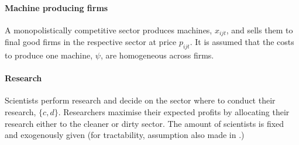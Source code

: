 \paragraph{Machine producing firms}
A monopolistically competitive sector produces machines, $x_{ijt}$, and sells them to final good firms in the respective sector at price $p_{ijt}$. It is assumed that the costs to produce one machine, $\psi$, are homogeneous across firms.
 \paragraph{Research}
 Scientists perform research and decide on the sector where to conduct their research, $\{c,d\}$. 
 Researchers maximise their expected profits by allocating their research either to the cleaner or dirty sector. The amount of scientists is fixed and exogenously given (for tractability, assumption also made in \cite{Acemoglu2002DirectedChange}.)
 
